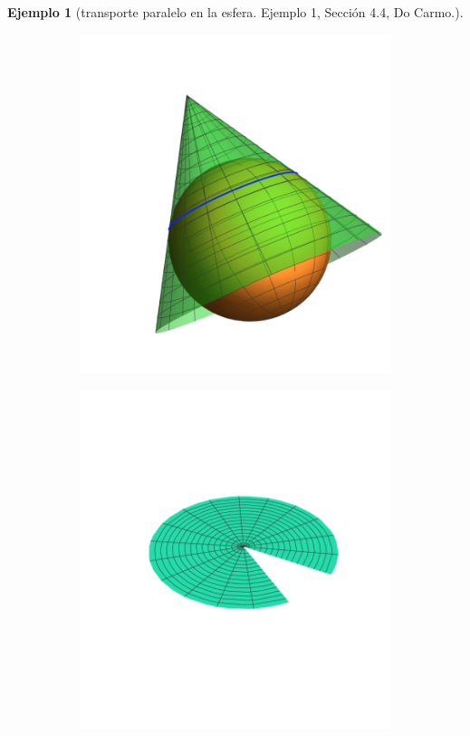 \documentclass[spanish]{book}
\theoremstyle{definition}
\newtheorem*{ejem}{Ejemplo}
\begin{document}
\begin{ejem}[transporte paralelo en la esfera. Ejemplo 1, Sección 4.4, Do Carmo.]
\begin{figure}[H]
\begin{subfigure}{0.5\textwidth}
			\includegraphics[width=\linewidth]{gauss9}
		\end{subfigure}
	\end{figure}
	\vspace{-3cm}
	\begin{figure}[H]
		\begin{subfigure}{0.5\textwidth}
			\centering
			\includegraphics[width=\linewidth]{gauss10}

\end{subfigure}
\end{figure}
\end{ejem}
\end{document}
